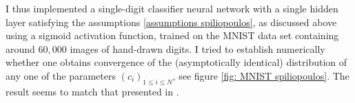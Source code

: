 \documentclass{article}
\begin{document}
I thus implemented a single-digit classifier neural network with a single hidden layer satisfying the assumptions \ref{assumptions spiliopoulos}, as discussed above using a sigmoid activation function, trained on the MNIST data set containing around $60,000$ images of hand-drawn digits. I tried to establish numerically whether one obtains convergence of the (asymptotically identical) distribution of any one of the parameters $ (c_{i})_{1\leq i\leq N}$, see figure \ref{fig: MNIST spiliopoulos}. The result seems to match that presented in \cite{sirignano2019meanfieldanalysislln}. 


\begin{figure}[H]\centering
{}\hfill
{}\par 
{}\hfill 

\end{figure}
\end{document}
